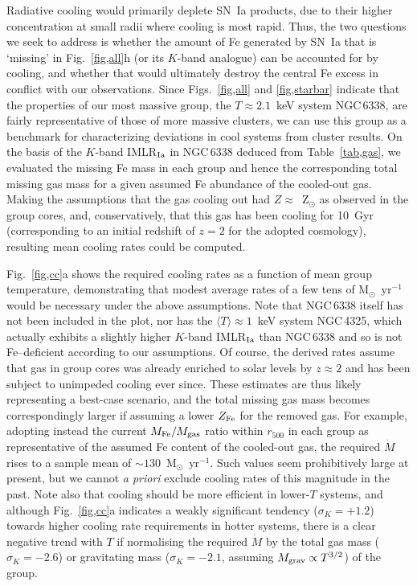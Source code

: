 \documentclass[useAMS,usenatbib]{mn2e}
\begin{document}
Radiative cooling would primarily deplete SN~Ia products, due to their
higher concentration at small radii where cooling is most rapid.
Thus, the two questions we seek to address is whether the amount of Fe
generated by SN~Ia that is `missing' in Fig.~\ref{fig,all}h (or its
$K$-band analogue) can be accounted for by cooling, and whether that
would ultimately destroy the central Fe excess in conflict with our
observations. Since Figs.~\ref{fig,all} and \ref{fig,starbar} indicate
that the properties of our most massive group, the $T\approx 2.1$~keV
system NGC\,6338, are fairly representative of those of more massive
clusters, we can use this group as a benchmark for characterizing
deviations in cool systems from cluster results.  On the basis of the
$K$-band IMLR$_{\rm Ia}$ in NGC\,6338 deduced from
Table~\ref{tab,gas}, we evaluated the missing Fe mass in each group
and hence the corresponding total missing gas mass for a given assumed
Fe abundance of the cooled-out gas. Making the assumptions that the
gas cooling out had $Z\approx $~Z$_\odot$ as observed in the group
cores, and, conservatively, that this gas has been cooling for 10~Gyr
(corresponding to an initial redshift of $z=2$ for the adopted
cosmology), resulting mean cooling rates could be computed.

Fig.~\ref{fig,cc}a shows the required cooling rates as a function of
mean group temperature, demonstrating that modest average rates of a
few tens of M$_\odot$~yr$^{-1}$ would be necessary under the above
assumptions.  Note that NGC\,6338 itself has not been included in the
plot, nor has the $\langle T\rangle \approx 1$~keV system NGC\,4325,
which actually exhibits a slightly higher $K$-band IMLR$_{\rm Ia}$
than NGC\,6338 and so is not Fe--deficient according to our
assumptions.  Of course, the derived rates assume that gas in group
cores was already enriched to solar levels by $z\approx 2$ and has
been subject to unimpeded cooling ever since. These estimates are thus
likely representing a best-case scenario, and the total missing gas
mass becomes correspondingly larger if assuming a lower $Z_{\rm Fe}$
for the removed gas. For example, adopting instead the current $M_{\rm
Fe}/M_{\rm gas}$ ratio within $r_{500}$ in each group as
representative of the assumed Fe content of the cooled-out gas, the
required $\dot M$ rises to a sample mean of $\sim
130$~M$_\odot$~yr$^{-1}$. Such values seem prohibitively large at
present, but we cannot {\em a priori} exclude cooling rates of this
magnitude in the past. Note also that cooling should be more efficient
in lower-$T$ systems, and although Fig.~\ref{fig,cc}a indicates a
weakly significant tendency ($\sigma_K = +1.2$) towards higher cooling
rate requirements in hotter systems, there is a clear negative trend
with $T$ if normalising the required $\dot M$ by the total gas mass
($\sigma_K=-2.6$) or gravitating mass ($\sigma_K=-2.1$, assuming
$M_{\rm grav}\propto T^{3/2}$) of the group.
\end{document}
